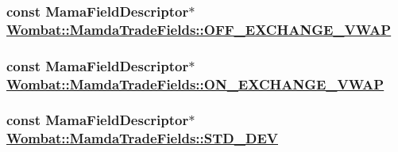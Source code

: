 \hypertarget{classWombat_1_1MamdaTradeFields_3cadc3e8e4dee2bcb33e94d5ccd61950}{
\subsubsection[OFF\_\-EXCHANGE\_\-VWAP]{\setlength{\rightskip}{0pt plus 5cm}const Mama\-Field\-Descriptor$\ast$ \hyperlink{classWombat_1_1MamdaTradeFields_3cadc3e8e4dee2bcb33e94d5ccd61950}{Wombat::Mamda\-Trade\-Fields::OFF\_\-EXCHANGE\_\-VWAP}}}
\label{classWombat_1_1MamdaTradeFields_3cadc3e8e4dee2bcb33e94d5ccd61950}


\hypertarget{classWombat_1_1MamdaTradeFields_6a61bbc368a916396aaace1adfaf449b}{
\subsubsection[ON\_\-EXCHANGE\_\-VWAP]{\setlength{\rightskip}{0pt plus 5cm}const Mama\-Field\-Descriptor$\ast$ \hyperlink{classWombat_1_1MamdaTradeFields_6a61bbc368a916396aaace1adfaf449b}{Wombat::Mamda\-Trade\-Fields::ON\_\-EXCHANGE\_\-VWAP}}}
\label{classWombat_1_1MamdaTradeFields_6a61bbc368a916396aaace1adfaf449b}


\hypertarget{classWombat_1_1MamdaTradeFields_f70a54c4b4e898fb67174065584deeb3}{
\subsubsection[STD\_\-DEV]{\setlength{\rightskip}{0pt plus 5cm}const Mama\-Field\-Descriptor$\ast$ \hyperlink{classWombat_1_1MamdaTradeFields_f70a54c4b4e898fb67174065584deeb3}{Wombat::Mamda\-Trade\-Fields::STD\_\-DEV}}}
\label{classWombat_1_1MamdaTradeFields_f70a54c4b4e898fb67174065584deeb3}


